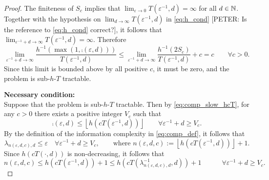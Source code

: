 \documentclass[sort&compress]{elsarticle}
\newcommand{\peter}[1]{\begingroup\color{purple}#1\endgroup}
\begin{document}
\begin{proof}
The finiteness of $S_c$ implies that $\lim_{\varepsilon \to 0} T(\varepsilon^{-1},d) = \infty$ for all $d \in \mathbb{N}$.  Together with  the hypothesis on $\lim_{d \to \infty} T(\varepsilon^{-1},d)$ in \eqref{eq:h_cond}
\peter{[PETER: Is the reference to \eqref{eq:h_cond} correct?]}, it follows that $\lim_{\varepsilon^{-1} + d \to \infty} T(\varepsilon^{-1},d) = \infty$.  Therefore
\begin{equation*}
	\lim_{\varepsilon^{-1} + d \to \infty} \frac{h^{-1}(\max(1,\comp(\varepsilon,d)))}{T(\varepsilon^{-1},d)}
	\le \lim_{\varepsilon^{-1} + d \to \infty} \frac{h^{-1} (2 S_c)}{T(\varepsilon^{-1},d)}  + c = c \qquad\forall c >  0.
\end{equation*}
Since this limit is bounded above by all positive $c$, it must be zero, and the problem is sub-$h$-$T$ tractable.


\bigskip

\noindent \textbf{Necessary condition:}\\
Suppose that the problem is  sub-$h$-$T$ tractable. Then by \eqref{eq:comp_slow_hcT}, for any $c>0$ there exists a positive integer $V_c$ such that
\begin{equation*}
	\comp(\varepsilon,d) \le \left\lfloor h(cT(\varepsilon^{-1},d)) \right\rfloor \qquad \forall \varepsilon^{-1} + d \ge V_c.
\end{equation*}
By the definition of the information complexity in \eqref{eq:comp_def}, it follows that
\[
	\lambda_{n(\varepsilon,d,c),d} \le \varepsilon \quad \forall \varepsilon^{-1} + d \ge V_c, \qquad \text{where }
	n(\varepsilon,d,c):=\left\lfloor h(cT(\varepsilon^{-1},d)) \right\rfloor +1.
\]
Since $h(cT(\cdot,d))$ is non-decreasing, it follows that
\begin{equation}
		n(\varepsilon,d,c)\le  h(cT(\varepsilon^{-1},d)) +1\le  h(cT(\lambda^{-1}_{n(\varepsilon,d,c),d},d)) +1\qquad  \quad \forall \varepsilon^{-1} + d \ge V_c. \label{eq:nedcbound}
\end{equation}


\end{proof}
\end{document}
